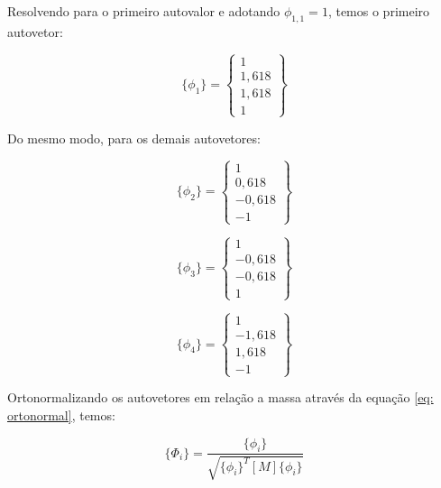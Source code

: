 \documentclass[a4paper, 12pt]{article}
\begin{document}
Resolvendo para o primeiro autovalor e adotando $\phi_{1,1} = 1$, temos o primeiro autovetor:

\begin{equation}
\{\phi_1\} =
\begin{Bmatrix}
1 \\
1{,}618 \\
1{,}618 \\
1
\end{Bmatrix}
\end{equation}

Do mesmo modo, para os demais autovetores:

\begin{equation}
\{\phi_2\} =
\begin{Bmatrix}
1 \\
0{,}618 \\
-0{,}618 \\
-1
\end{Bmatrix}
\end{equation}

\begin{equation}
\{\phi_3\} =
\begin{Bmatrix}
1 \\
-0{,}618 \\
-0{,}618 \\
1
\end{Bmatrix}
\end{equation}

\begin{equation}
\{\phi_4\} =
\begin{Bmatrix}
1 \\
-1{,}618 \\
1{,}618 \\
-1
\end{Bmatrix}
\end{equation}

Ortonormalizando os autovetores em relação a massa através da equação \ref{eq: ortonormal}, temos:

\begin{equation}
\{\Phi_i\} =
\frac{\{\phi_i\}}
{\sqrt{\{\phi_i\}^{T}[M]\{\phi_i\}}}
\label{eq: ortonormal}
\end{equation}
\end{document}

